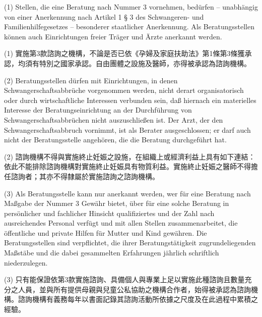 \documentclass[12pt]{article}
\begin{document}
\begin{sourcepara}[title={原文主文 II.4(1)}]
(1) Stellen, die eine Beratung nach Nummer 3 vornehmen, bedürfen -- unabhängig von einer Anerkennung nach Artikel 1 § 3 des Schwangeren- und Familienhilfegesetzes -- besonderer staatlicher Anerkennung. Als Beratungsstellen können auch Einrichtungen freier Träger und Ärzte anerkannt werden.
\end{sourcepara}
\begin{transpara}
(1) 實施第3款諮詢之機構，不論是否已依《孕婦及家庭扶助法》第1條第3條獲承認，均須有特別之國家承認。自由團體之設施及醫師，亦得被承認為諮詢機構。
\end{transpara}

\begin{sourcepara}[title={原文主文 II.4(2)}]
(2) Beratungsstellen dürfen mit Einrichtungen, in denen Schwangerschaftsabbrüche vorgenommen werden, nicht derart organisatorisch oder durch wirtschaftliche Interessen verbunden sein, daß hiernach ein materielles Interesse der Beratungseinrichtung an der Durchführung von Schwangerschaftsabbrüchen nicht auszuschließen ist. Der Arzt, der den Schwangerschaftsabbruch vornimmt, ist als Berater ausgeschlossen; er darf auch nicht der Beratungsstelle angehören, die die Beratung durchgeführt hat.
\end{sourcepara}
\begin{transpara}
(2) 諮詢機構不得與實施終止妊娠之設施，在組織上或經濟利益上具有如下連結：依此不能排除諮詢機構對實施終止妊娠具有物質利益。實施終止妊娠之醫師不得擔任諮詢者；其亦不得隸屬於實施諮詢之諮詢機構。
\end{transpara}

\begin{sourcepara}[title={原文主文 II.4(3)}]
(3) Als Beratungsstelle kann nur anerkannt werden, wer für eine Beratung nach Maßgabe der Nummer 3 Gewähr bietet, über für eine solche Beratung in persönlicher und fachlicher Hinsicht qualifiziertes und der Zahl nach ausreichendes Personal verfügt und mit allen Stellen zusammenarbeitet, die öffentliche und private Hilfen für Mutter und Kind gewähren. Die Beratungsstellen sind verpflichtet, die ihrer Beratungstätigkeit zugrundeliegenden Maßstäbe und die dabei gesammelten Erfahrungen jährlich schriftlich niederzulegen.
\end{sourcepara}
\begin{transpara}
(3) 只有能保證依第3款實施諮詢、具備個人與專業上足以實施此種諮詢且數量充分之人員，並與所有提供母親與兒童公私協助之機構合作者，始得被承認為諮詢機構。諮詢機構有義務每年以書面記錄其諮詢活動所依據之尺度及在此過程中累積之經驗。
\end{transpara}
\end{document}
